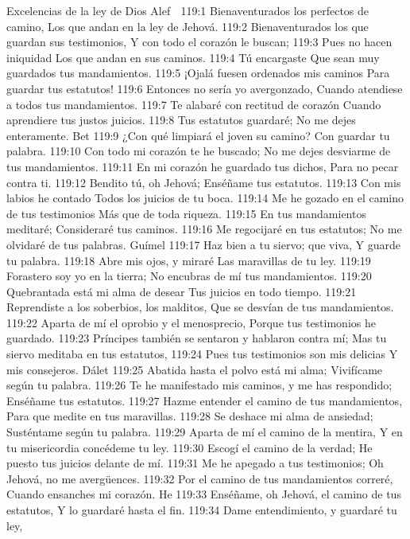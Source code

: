 Excelencias de la ley de Dios 
Alef 

119:1 Bienaventurados los perfectos de camino, 
Los que andan en la ley de Jehová. 
119:2 Bienaventurados los que guardan sus testimonios, 
Y con todo el corazón le buscan; 
119:3 Pues no hacen iniquidad 
Los que andan en sus caminos. 
119:4 Tú encargaste 
Que sean muy guardados tus mandamientos. 
119:5 ¡Ojalá fuesen ordenados mis caminos 
Para guardar tus estatutos! 
119:6 Entonces no sería yo avergonzado, 
Cuando atendiese a todos tus mandamientos. 
119:7 Te alabaré con rectitud de corazón 
Cuando aprendiere tus justos juicios. 
119:8 Tus estatutos guardaré; 
No me dejes enteramente. 
Bet 
119:9 ¿Con qué limpiará el joven su camino? 
Con guardar tu palabra. 
119:10 Con todo mi corazón te he buscado; 
No me dejes desviarme de tus mandamientos. 
119:11 En mi corazón he guardado tus dichos, 
Para no pecar contra ti. 
119:12 Bendito tú, oh Jehová; 
Enséñame tus estatutos. 
119:13 Con mis labios he contado 
Todos los juicios de tu boca. 
119:14 Me he gozado en el camino de tus testimonios 
Más que de toda riqueza. 
119:15 En tus mandamientos meditaré; 
Consideraré tus caminos. 
119:16 Me regocijaré en tus estatutos; 
No me olvidaré de tus palabras. 
Guímel 
119:17 Haz bien a tu siervo; que viva, 
Y guarde tu palabra. 
119:18 Abre mis ojos, y miraré 
Las maravillas de tu ley. 
119:19 Forastero soy yo en la tierra; 
No encubras de mí tus mandamientos. 
119:20 Quebrantada está mi alma de desear 
Tus juicios en todo tiempo. 
119:21 Reprendiste a los soberbios, los malditos, 
Que se desvían de tus mandamientos. 
119:22 Aparta de mí el oprobio y el menosprecio, 
Porque tus testimonios he guardado. 
119:23 Príncipes también se sentaron y hablaron contra mí; 
Mas tu siervo meditaba en tus estatutos, 
119:24 Pues tus testimonios son mis delicias 
Y mis consejeros. 
Dálet 
119:25 Abatida hasta el polvo está mi alma; 
Vivifícame según tu palabra. 
119:26 Te he manifestado mis caminos, y me has respondido; 
Enséñame tus estatutos. 
119:27 Hazme entender el camino de tus mandamientos, 
Para que medite en tus maravillas. 
119:28 Se deshace mi alma de ansiedad; 
Susténtame según tu palabra. 
119:29 Aparta de mí el camino de la mentira, 
Y en tu misericordia concédeme tu ley. 
119:30 Escogí el camino de la verdad; 
He puesto tus juicios delante de mí. 
119:31 Me he apegado a tus testimonios; 
Oh Jehová, no me avergüences. 
119:32 Por el camino de tus mandamientos correré, 
Cuando ensanches mi corazón. 
He 
119:33 Enséñame, oh Jehová, el camino de tus estatutos, 
Y lo guardaré hasta el fin. 
119:34 Dame entendimiento, y guardaré tu ley, 
